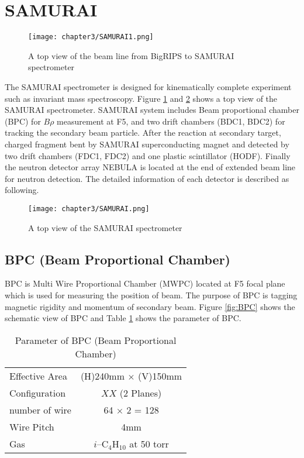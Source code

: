 \section{SAMURAI}

\begin{figure}[hbt!]
    \centering
    \texttt{[image: chapter3/SAMURAI1.png]}
    \caption{A top view of the beam line from BigRIPS to SAMURAI spectrometer\cite{BigRIPSInfo}}
    \label{fig:BigRIPStoSAMURAI}
\end{figure}

The SAMURAI spectrometer is designed for kinematically complete experiment such as invariant mass spectroscopy\cite{SAMURAIConcept}. Figure \ref{fig:BigRIPStoSAMURAI} and \ref{fig:SAMURAI} shows a top view of the SAMURAI spectrometer. SAMURAI system includes Beam proportional chamber (BPC) for $B\rho$ measurement at F5, and two drift chambers (BDC1, BDC2) for tracking the secondary beam particle. After the reaction at secondary target, charged fragment bent by SAMURAI superconducting magnet and detected by two drift chambers (FDC1, FDC2) and one plastic scintillator (HODF). Finally the neutron detector array NEBULA is located at the end of extended beam line for neutron detection. The detailed information of each detector is described as following.

\begin{figure}[t]
    \centering
    \texttt{[image: chapter3/SAMURAI.png]}
    \caption{A top view of the SAMURAI spectrometer\cite{SAMURAI}}
    \label{fig:SAMURAI}
\end{figure}

\subsection{BPC (Beam Proportional Chamber)}
BPC is Multi Wire Proportional Chamber (MWPC) located at F5 focal plane which is used for measuring the position of beam. The purpose of BPC is tagging magnetic rigidity and momentum of secondary beam. Figure \ref{fig:BPC} shows the schematic view of BPC and Table \ref{tab:BPC} shows the parameter of BPC.
\begin{table}[h]
    \centering
    \begin{tabular}{l|c}
        \hline
        Effective Area & (H)240mm $\times$ (V)150mm \\
        Configuration & $XX$ (2 Planes) \\
        number of wire & 64 $\times$ 2 = 128 \\
        Wire Pitch & 4mm \\
        Gas & $i$--${\text{C}}_{4} {\text{H}}_{10}$ at 50 torr\\
        \hline
    \end{tabular}
    \caption{Parameter of BPC (Beam Proportional Chamber) \cite{SAMURAI}}
    \label{tab:BPC}
\end{table}

